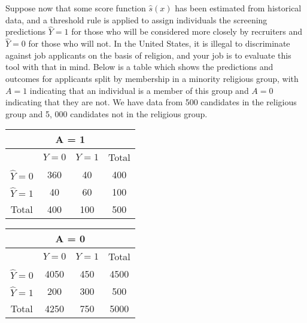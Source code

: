 \documentclass[a4paper]{article}
\begin{document}
        Suppose now that some score function $\hat{s}(x)$ has been estimated from historical data, and a threshold rule is applied to assign individuals the screening predictions $\hat{Y} = 1$ for those who will be considered more closely by recruiters and $\hat{Y} = 0$ for those who will not.
        In the United States, it is illegal to discriminate against job applicants on the basis of religion, and your job is to evaluate this tool with that in mind.
        Below is a table which shows the predictions and outcomes for applicants split by membership in a minority religious group, with $A = 1$ indicating that an individual is a member of this group and $A = 0$ indicating that they are not.
        We have data from 500 candidates in the religious group and 5, 000 candidates not in the religious group.

\begin{table}[h]
\centering
\begin{tabular}{|c|c|c|c|}
\hline
\multicolumn{4}{|c|}{A = 1} \\
\hline
 & $Y=0$ & $Y=1$ & Total \\
\hline
$\hat{Y}=0$ & 360 & 40 & 400 \\
\hline
$\hat{Y}=1$ & 40 & 60 & 100 \\
\hline
Total & 400 & 100 & 500 \\
\hline
\end{tabular}
\hspace{1cm}
\begin{tabular}{|c|c|c|c|}
\hline
\multicolumn{4}{|c|}{A = 0} \\
\hline
 & $Y=0$ & $Y=1$ & Total \\
\hline
$\hat{Y}=0$ & 4050 & 450 & 4500 \\
\hline
$\hat{Y}=1$ & 200 & 300 & 500 \\
\hline
Total & 4250 & 750 & 5000 \\
\hline
\end{tabular}
\end{table}
\end{document}

